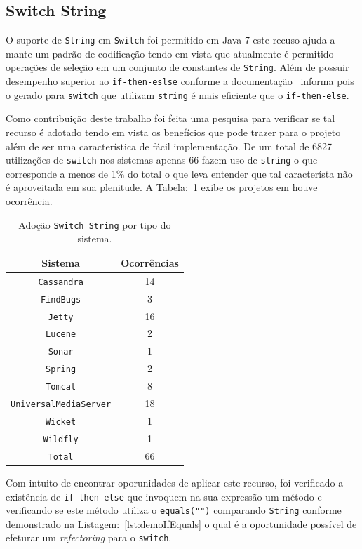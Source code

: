 \subsection{Switch String}

O suporte de \texttt{String} em \texttt{Switch} foi permitido em Java 7 este recuso ajuda a mante um padrão de codificação tendo em vista que atualmente é permitido operações de seleção em um conjunto de constantes de \texttt{String}. Além de possuir desempenho superior ao \texttt{if-then-eslse} conforme a documentação~\cite{docSwitch} informa pois o gerado para \texttt{switch} que utilizam \texttt{string} é mais eficiente que o \texttt{if-then-else}.

Como contribuição deste trabalho foi feita uma pesquisa para verificar se tal recurso é adotado tendo em vista os benefícios que pode trazer para o projeto além de ser uma característica de fácil implementação. De um total de \num{6827} utilizações de \texttt{switch} nos sistemas apenas \num{66} fazem uso de \texttt{string} o que corresponde a menos de \num{1}\% do total o que leva entender que tal característa não é aproveitada em sua plenitude. A Tabela:~\ref{tab:adocaoSwitchString} exibe os projetos em houve ocorrência.


\begin{table}[h]
	\centering
	\caption{Adoção \texttt{Switch String} por tipo do sistema.}
	\begin{tabular}{cc}
		\hline
		Sistema & Ocorrências \\ 
		\hline \hline
		\texttt{Cassandra} & 14 \\ 
		\texttt{FindBugs} & 3 \\ 
		\texttt{Jetty} & 16 \\
		\texttt{Lucene} & 2 \\
		\texttt{Sonar} & 1 \\
		\texttt{Spring} & 2 \\
		\texttt{Tomcat} & 8 \\
		\texttt{UniversalMediaServer} & 18 \\
		\texttt{Wicket} & 1 \\
		\texttt{Wildfly} & 1 \\	 \hline
		\texttt{Total} & 66 \\ \hline
	\end{tabular}
	\label{tab:adocaoSwitchString} %
\end{table}


Com intuito de encontrar oporunidades de aplicar este recurso, foi verificado a existência de \texttt{if-then-else} que invoquem na sua expressão um método e verificando se este método utiliza o \texttt{equals("")} comparando \texttt{String} conforme demonstrado na Listagem:~\ref{lst:demoIfEquals} o qual é a oportunidade possível de efeturar um  \textit{refectoring} para o \texttt{switch}.

